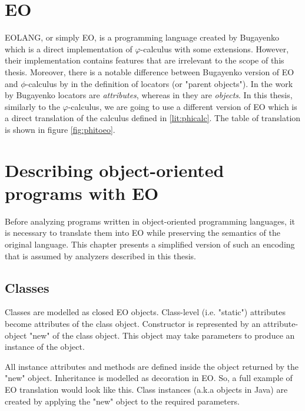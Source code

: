 


\section{EO}
\label{lit:eo}
EOLANG, or simply EO, is a programming language created by Bugayenko \cite{eolang} which is a direct implementation of $\varphi$-calculus with some extensions. However, their implementation contains features that are irrelevant to the scope of this thesis. Moreover, there is a notable difference between Bugayenko version of EO and $\phi$-calculus by \cite{kudasov} in the definition of locators (or "parent objects"). In the work by Bugayenko locators are \textit{attributes}, whereas in \cite{kudasov} they are \textit{objects}. In this thesis, similarly to the $\varphi$-calculus, we are going to use a different version of EO which is a direct translation of the calculus defined in \ref{lit:phicalc}. The table of translation is shown in figure \ref{fig:phitoeo}.



\section{Describing object-oriented programs with EO}
\label{lit:encoding}
Before analyzing programs written in object-oriented programming languages, it is necessary to translate them into EO while preserving the semantics of the original language. This chapter presents a simplified version of such an encoding that is assumed by analyzers described in this thesis.

\subsection{Classes}
Classes are modelled as closed EO objects. Class-level (i.e. "static") attributes become attributes of the class object. Constructor is represented by an attribute-object "new" of the class object. This object may take parameters to produce an instance of the object.

All instance attributes and methods are defined inside the object returned by the "new" object. Inheritance is modelled as decoration in EO. So, a full example of EO translation would look like this. Class instances (a.k.a objects in Java) are created
by applying the "new" object to the required parameters.


